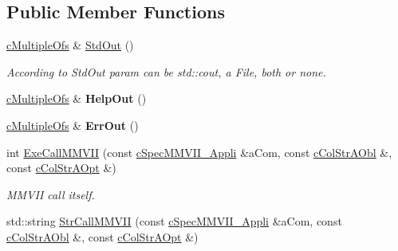 \subsection*{Public Member Functions}
\begin{DoxyCompactItemize}
\item 
\hyperlink{classMMVII_1_1cMultipleOfs}{c\+Multiple\+Ofs} \& \hyperlink{classMMVII_1_1cMMVII__Appli_a1c67e0a7c0535bb3db8092b58ff55a82}{Std\+Out} ()
\begin{DoxyCompactList}\small\item\em According to Std\+Out param can be std\+::cout, a File, both or none. \end{DoxyCompactList}\item 
\hyperlink{classMMVII_1_1cMultipleOfs}{c\+Multiple\+Ofs} \& {\bfseries Help\+Out} ()\hypertarget{classMMVII_1_1cMMVII__Appli_adfd24de7c53a76cd576b8a4e87d91174}{}\label{classMMVII_1_1cMMVII__Appli_adfd24de7c53a76cd576b8a4e87d91174}

\item 
\hyperlink{classMMVII_1_1cMultipleOfs}{c\+Multiple\+Ofs} \& {\bfseries Err\+Out} ()\hypertarget{classMMVII_1_1cMMVII__Appli_ab69cb7d59baeea806ec4fc69583132b8}{}\label{classMMVII_1_1cMMVII__Appli_ab69cb7d59baeea806ec4fc69583132b8}

\item 
int \hyperlink{classMMVII_1_1cMMVII__Appli_a16a6715361cd18fadd7886ac4f8ca54a}{Exe\+Call\+M\+M\+V\+II} (const \hyperlink{classMMVII_1_1cSpecMMVII__Appli}{c\+Spec\+M\+M\+V\+I\+I\+\_\+\+Appli} \&a\+Com, const \hyperlink{classMMVII_1_1cColStrAObl}{c\+Col\+Str\+A\+Obl} \&, const \hyperlink{classMMVII_1_1cColStrAOpt}{c\+Col\+Str\+A\+Opt} \&)\hypertarget{classMMVII_1_1cMMVII__Appli_a16a6715361cd18fadd7886ac4f8ca54a}{}\label{classMMVII_1_1cMMVII__Appli_a16a6715361cd18fadd7886ac4f8ca54a}

\begin{DoxyCompactList}\small\item\em M\+M\+V\+II call itself. \end{DoxyCompactList}\item 
std\+::string \hyperlink{classMMVII_1_1cMMVII__Appli_ab4d75b4b3658ee638e171f7ec92ca527}{Str\+Call\+M\+M\+V\+II} (const \hyperlink{classMMVII_1_1cSpecMMVII__Appli}{c\+Spec\+M\+M\+V\+I\+I\+\_\+\+Appli} \&a\+Com, const \hyperlink{classMMVII_1_1cColStrAObl}{c\+Col\+Str\+A\+Obl} \&, const \hyperlink{classMMVII_1_1cColStrAOpt}{c\+Col\+Str\+A\+Opt} \&)\hypertarget{classMMVII_1_1cMMVII__Appli_ab4d75b4b3658ee638e171f7ec92ca527}{}\label{classMMVII_1_1cMMVII__Appli_ab4d75b4b3658ee638e171f7ec92ca527}


\end{DoxyCompactItemize}
